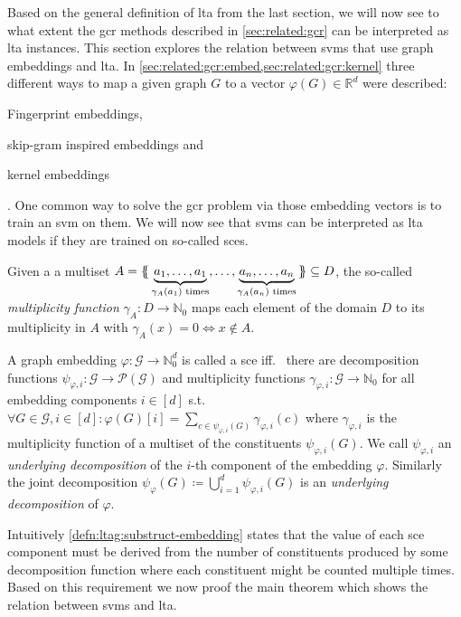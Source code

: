 Based on the general definition of \ac{lta} from the last section, we will now see to what extent the \ac{gcr} methods described in \cref{sec:related:gcr} can be interpreted as \ac{lta} instances.
This section explores the relation between \acp{svm} that use graph embeddings and \ac{lta}.
In \cref{sec:related:gcr:embed,sec:related:gcr:kernel} three different ways to map a given graph $G$ to a vector $\varphi(G) \in \mathbb{R}^d$ were described:
\begin{enumerate*}
	\item Fingerprint embeddings,
	\item skip-gram inspired embeddings and
	\item kernel embeddings
\end{enumerate*}.
One common way to solve the \ac{gcr} problem via those embedding vectors is to train an \ac{svm} on them.
We will now see that \acp{svm} can be interpreted as \ac{lta} models if they are trained on so-called \acp*{sce}.
\begin{defn}
	Given a a multiset $A = \ldblbrace \underbrace{a_1, \dots, a_1}_{\gamma_A(a_1)\text{ times}},\allowbreak \dots, \underbrace{a_n, \dots, a_n}_{\gamma_A(a_n)\text{ times}} \rdblbrace \subseteq D$, the so-called \textit{multiplicity function} $\gamma_A: D \to \mathbb{N}_0$ maps each element of the domain $D$ to its multiplicity in $A$ with $\gamma_A(x) = 0 \Leftrightarrow x \notin A$.
\end{defn}
\begin{defn}\label{defn:ltag:substruct-embedding}
	A graph embedding $\varphi: \mathcal{G} \to \mathbb{N}_0^{d}$ is called a \ac{sce} iff.\ %
	there are decomposition functions $\psi_{\varphi, i}: \mathcal{G} \to \mathcal{P}(\mathcal{G})$ and multiplicity functions $\gamma_{\varphi, i}: \mathcal{G} \to \mathbb{N}_0$ for all embedding components $i \in [d]$ s.t.\ %
	$\forall G \in \mathcal{G}, i \in [d]: \varphi(G)[i] = \sum_{c \in \psi_{\varphi, i}(G)} \gamma_{\varphi, i}(c)$ where $\gamma_{\varphi, i}$ is the multiplicity function of a multiset of the constituents $\psi_{\varphi, i}(G)$.
	We call $\psi_{\varphi, i}$ an \textit{underlying decomposition} of the $i$-th component of the embedding $\varphi$.
	Similarly the joint decomposition $\psi_{\varphi}(G) \coloneqq \bigcup_{i=1}^d \psi_{\varphi,i}(G)$ is an \textit{underlying decomposition} of $\varphi$.
\end{defn}
Intuitively \cref{defn:ltag:substruct-embedding} states that the value of each \ac{sce} component must be derived from the number of constituents produced by some decomposition function where each constituent might be counted multiple times.
Based on this requirement we now proof the main theorem which shows the relation between \acp{svm} and \ac{lta}.

